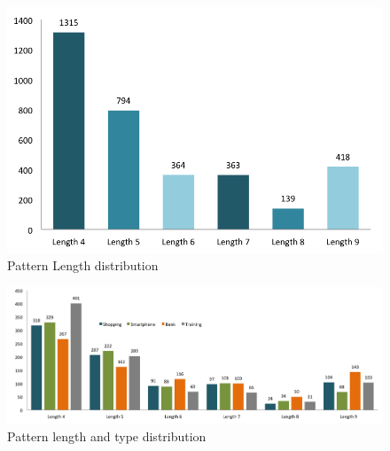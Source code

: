     \begin{figure}[H]
      \centering
      \includegraphics[scale=0.5]{pics/analysis/patternLength.png}
      \caption{Pattern Length distribution}
      \label{fig:patternLength}
    \end{figure}

    \begin{figure}[H]
      \centering
      \includegraphics[width=\textwidth]{pics/analysis/patterntypePatternLength.png}
      \caption{Pattern length and type distribution}
      \label{fig:patternTypePatternLength}
    \end{figure}

